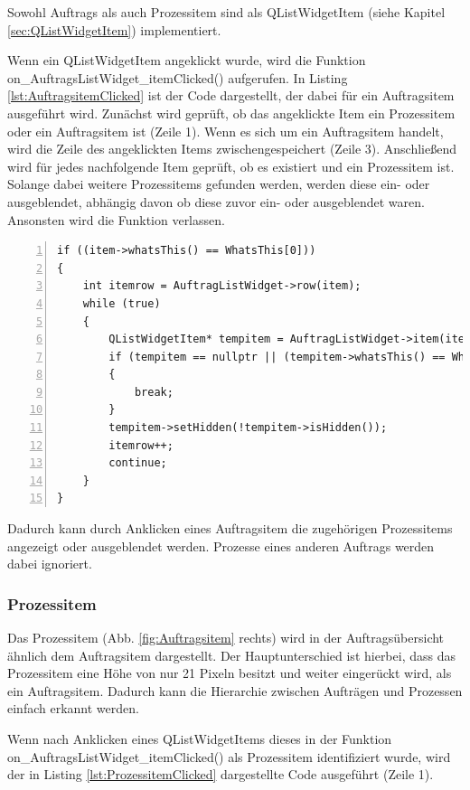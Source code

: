 Sowohl Auftrags als auch Prozessitem sind als QListWidgetItem (siehe Kapitel \ref{sec:QListWidgetItem}) implementiert.

Wenn ein QListWidgetItem angeklickt wurde, wird die Funktion on\_Auftrags\-List\-Widget\-\_item\-Clicked() aufgerufen. In Listing \ref{lst:AuftragsitemClicked} ist der Code dargestellt, der dabei für ein Auftragsitem ausgeführt wird. Zunächst wird geprüft, ob das angeklickte Item ein Prozessitem oder ein Auftragsitem ist (Zeile 1). Wenn es sich um ein Auftragsitem handelt, wird die Zeile des angeklickten Items zwischengespeichert (Zeile 3). Anschließend wird für jedes nachfolgende Item geprüft, ob es existiert und ein Prozessitem ist. Solange dabei weitere Prozessitems gefunden werden, werden diese ein- oder ausgeblendet, abhängig davon ob diese zuvor ein- oder ausgeblendet waren. Ansonsten wird die Funktion verlassen.

\begin{lstlisting}[frame=single, breaklines=true, numbers=left, stepnumber=2, firstnumber=1, numberstyle = \tiny, caption=Funktionsblock nach Klicken auf Auftragsitem ,label=lst:AuftragsitemClicked]
if ((item->whatsThis() == WhatsThis[0]))
{
    int itemrow = AuftragListWidget->row(item);
    while (true)
    {
        QListWidgetItem* tempitem = AuftragListWidget->item(itemrow+1);
        if (tempitem == nullptr || (tempitem->whatsThis() == WhatsThis[0]))
        {
            break;
        }
        tempitem->setHidden(!tempitem->isHidden());
        itemrow++;
        continue;
    }
}
\end{lstlisting}

Dadurch kann durch Anklicken eines Auftragsitem die zugehörigen Prozessitems angezeigt oder ausgeblendet werden. Prozesse eines anderen Auftrags werden dabei ignoriert.

\subsubsection{Prozessitem}

Das Prozessitem (Abb. \ref{fig:Auftragsitem} rechts) wird in der Auftragsübersicht ähnlich dem Auftragsitem dargestellt. Der Hauptunterschied ist hierbei, dass das Prozessitem eine Höhe von nur 21 Pixeln besitzt und weiter eingerückt wird, als ein Auftragsitem. Dadurch kann die Hierarchie zwischen Aufträgen und Prozessen einfach erkannt werden. 

Wenn nach Anklicken eines QListWidgetItems dieses in der Funktion on\_\-Auftrags\-List\-Widget\_\-item\-Clicked() als Prozessitem identifiziert wurde, wird der in Listing \ref{lst:ProzessitemClicked} dargestellte Code ausgeführt (Zeile 1). 

